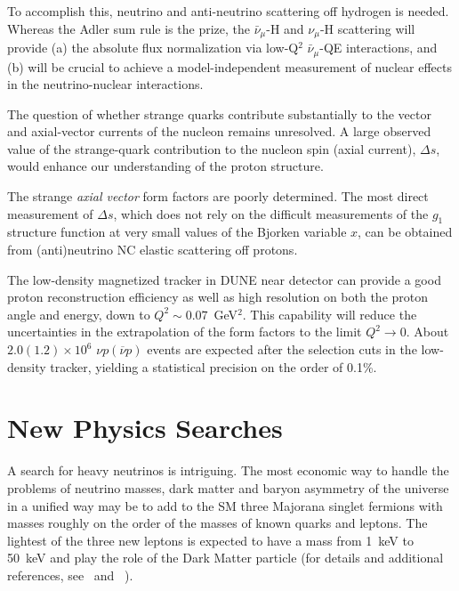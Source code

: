 To accomplish this, neutrino and anti-neutrino scattering off hydrogen
is needed.  Whereas the Adler sum rule is the prize, the $\bar
\nu_\mu$-H and $\nu_\mu$-H scattering will provide (a) the absolute
flux normalization via low-Q$^2$ $\bar \nu_\mu$-QE interactions, and
(b) will be crucial to achieve a model-independent measurement of
nuclear effects in the neutrino-nuclear interactions.

The question of whether strange quarks contribute substantially to the
vector and axial-vector currents of the nucleon remains unresolved. A
large observed value of the strange-quark contribution to the nucleon
spin (axial current), $\Delta s$, would enhance our understanding of
the proton structure.

The strange \emph{axial vector} form factors are poorly
determined. The most direct measurement of $\Delta s$, which does not
rely on the difficult measurements of the $g_1$ structure function at
very small values of the Bjorken variable $x$, can be obtained from
(anti)neutrino NC elastic scattering off protons.  %

The low-density magnetized tracker in DUNE near detector can provide a
good proton reconstruction efficiency as well as high resolution on
both the proton angle and energy, down to $Q^2\sim0.07$~GeV$^2$.  This
capability will reduce the uncertainties in the extrapolation of the
form factors to the limit $Q^2 \to 0$. About $2.0 (1.2) \times 10^6$
$\nu p (\overline{\nu} p)$ events are expected after the selection
cuts in the low-density tracker, yielding a statistical precision on
the order of 0.1\%.


\section{New Physics Searches} 
\label{sec-nd-np} 

A search for heavy neutrinos is intriguing.  The most economic way to
handle the problems of neutrino masses, dark matter and baryon
asymmetry of the universe in a unified way may be to add to the SM
three Majorana singlet fermions with masses roughly on the order of
the masses of known quarks and leptons.
The lightest of the three new leptons is expected to have a mass from
1~keV to 50~keV and play the role of the Dark Matter particle (for
details and additional references, see~\cite{DPR} and
~\cite{Adams:2013qkq}).

